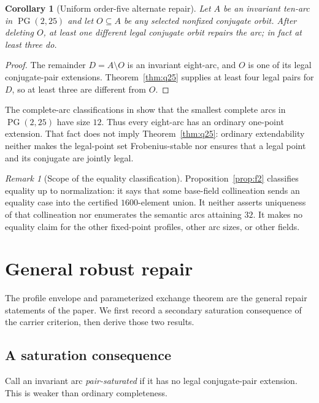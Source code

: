 \documentclass[11pt]{article}
\newtheorem{corollary}[theorem]{Corollary}
\theoremstyle{definition}
\theoremstyle{remark}
\newtheorem{remark}[theorem]{Remark}
\newcommand{\PG}{\operatorname{PG}}
\begin{document}
\begin{corollary}[Uniform order-five alternate repair]
\label{cor:q25-uniform-repair}
Let $A$ be an invariant ten-arc in $\PG(2,25)$ and let $O\subseteq A$ be
any selected nonfixed conjugate orbit.  After deleting $O$, at least one
different legal conjugate orbit repairs the arc; in fact at least three do.
\end{corollary}

\begin{proof}
The remainder $D=A\setminus O$ is an invariant eight-arc, and $O$ is one
of its legal conjugate-pair extensions.  Theorem~\ref{thm:q25} supplies at
least four legal pairs for $D$, so at least three are different from $O$.
\end{proof}

The complete-arc classifications in
\cite{MarcuginiMilaniPambianco2007,CoolsaetSticker2009} show that the
smallest complete arcs in $\PG(2,25)$ have size $12$.  Thus every eight-arc
has an ordinary one-point extension.  That fact does not imply
Theorem~\ref{thm:q25}: ordinary extendability neither makes the legal-point
set Frobenius-stable nor ensures that a legal point and its conjugate are
jointly legal.

\begin{remark}[Scope of the equality classification]\label{rem:census}
Proposition~\ref{prop:f2} classifies equality up to normalization: it says
that some base-field collineation sends an equality case into the certified
$1600$-element union.  It neither asserts uniqueness of that collineation
nor enumerates the semantic arcs attaining $32$.  It makes no equality
claim for the other fixed-point profiles, other arc sizes, or other fields.
\end{remark}

\section{General robust repair}

The profile envelope and parameterized exchange theorem are the general
repair statements of the paper.  We first record a secondary saturation
consequence of the carrier criterion, then derive those two results.

\subsection*{A saturation consequence}

Call an invariant arc \emph{pair-saturated} if it has no legal conjugate-pair
extension.  This is weaker than ordinary completeness.
\end{document}
